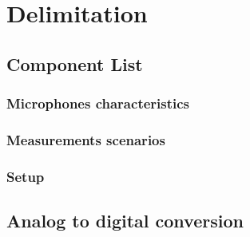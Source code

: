 \chapter{Delimitation}\label{Delimitation}
\section{Component List}
\subsection{Microphones characteristics}
\subsection{Measurements scenarios}
\subsection{Setup}
\section{Analog to digital conversion}



